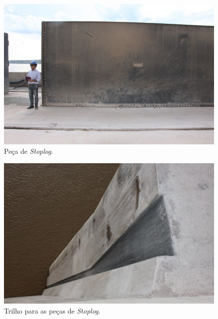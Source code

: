 \begin{figure}[h!]
    \centering \includegraphics[width=0.6\columnwidth]{figs/jirau/jirau_14}
    \caption{Peça de \emph{Stoplog}.}
    \label{fig:jirau14}
\end{figure}

\begin{figure}[h!]
    \centering \includegraphics[width=0.6\columnwidth]{figs/jirau/jirau_15}
    \caption{Trilho para as peças de \emph{Stoplog}.}
    \label{fig:jirau15}
\end{figure}

